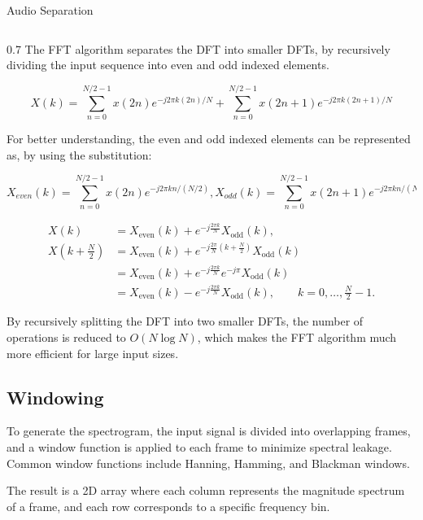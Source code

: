 \documentclass[aspectratio=169]{beamer}
\begin{document}
\begin{frame}{Audio Separation}
\begin{columns}[T]
\begin{column}{0.7\textwidth}
        \noindent The FFT algorithm separates the DFT into smaller DFTs, by recursively dividing the input sequence into even and odd indexed elements.

        \begin{equation}
            X(k) = \sum_{n=0}^{N/2-1} x(2n) e^{-j2\pi k(2n)/N} + \sum_{n=0}^{N/2-1} x(2n+1) e^{-j2\pi k(2n+1)/N}
        \end{equation}

        \noindent For better understanding, the even and odd indexed elements can be represented as, by using the substitution:

        \begin{equation}
            X_{even}(k) = \sum_{n=0}^{N/2-1} x(2n) e^{-j2\pi kn/(N/2)}
            ,
            X_{odd}(k) = \sum_{n=0}^{N/2-1} x(2n+1) e^{-j2\pi kn/(N/2)}
        \end{equation}
    
        \begin{align}
            X(k) &= X_{\mathrm{even}}(k) + e^{-j\frac{2\pi k}{N}}X_{\mathrm{odd}}(k), \\
            X\left(k+\frac{N}{2}\right)
            &= X_{\mathrm{even}}(k)
               + e^{-j\frac{2\pi}{N}\left(k+\frac{N}{2}\right)}X_{\mathrm{odd}}(k) \\
            &= X_{\mathrm{even}}(k)
               + e^{-j\frac{2\pi k}{N}}e^{-j\pi}X_{\mathrm{odd}}(k) \\
            &= X_{\mathrm{even}}(k)
               - e^{-j\frac{2\pi k}{N}}X_{\mathrm{odd}}(k),
            \qquad k=0,\dots,\frac{N}{2}-1.
            \end{align}

        \noindent By  recursively splitting the DFT into two smaller DFTs, the number of operations is reduced to $O(N \log N)$, which makes the FFT algorithm much more efficient for large input sizes.

     \subsection{Windowing}
        To generate the spectrogram, the input signal is divided into overlapping frames, and a window function is applied to each frame to minimize spectral leakage.
        Common window functions include Hanning, Hamming, and Blackman windows.
        
        \noindent The result is a 2D array where each column represents the magnitude spectrum of a frame, and each row corresponds to a specific frequency bin.


\end{column}
\end{columns}
\end{frame}
\end{document}
